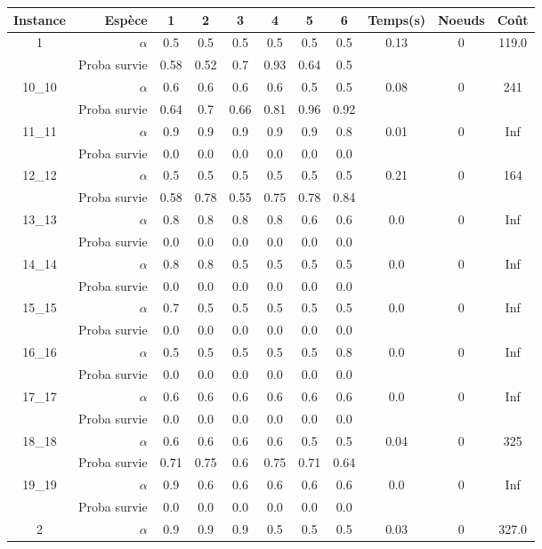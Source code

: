 \documentclass[main.tex]{subfiles}
\begin{document}
	\begin{center}
	\begin{tabular}{|c||r|c|c|c|c|c|c||c|c|c|}
    \hline
    \textbf{Instance}&\textbf{Espèce}&1&2&3&4&5&6&\textbf{Temps(s)}&\textbf{Noeuds}&\textbf{Coût}\\
\hline\hline
1 &$\alpha$&0.5 &0.5 &0.5 &0.5 &0.5 &0.5 &0.13 &0 &119.0\\
&Proba survie &0.58 &0.52 &0.7 &0.93 &0.64 &0.5 && &\\
\hline\hline
10_10 &$\alpha$&0.6 &0.6 &0.6 &0.6 &0.5 &0.5 &0.08 &0 &241\\
&Proba survie &0.64 &0.7 &0.66 &0.81 &0.96 &0.92 && &\\
\hline\hline
11_11 &$\alpha$&0.9 &0.9 &0.9 &0.9 &0.9 &0.8 &0.01 &0 &Inf\\
&Proba survie &0.0 &0.0 &0.0 &0.0 &0.0 &0.0 && &\\
\hline\hline
12_12 &$\alpha$&0.5 &0.5 &0.5 &0.5 &0.5 &0.5 &0.21 &0 &164\\
&Proba survie &0.58 &0.78 &0.55 &0.75 &0.78 &0.84 && &\\
\hline\hline
13_13 &$\alpha$&0.8 &0.8 &0.8 &0.8 &0.6 &0.6 &0.0 &0 &Inf\\
&Proba survie &0.0 &0.0 &0.0 &0.0 &0.0 &0.0 && &\\
\hline\hline
14_14 &$\alpha$&0.8 &0.8 &0.5 &0.5 &0.5 &0.5 &0.0 &0 &Inf\\
&Proba survie &0.0 &0.0 &0.0 &0.0 &0.0 &0.0 && &\\
\hline\hline
15_15 &$\alpha$&0.7 &0.5 &0.5 &0.5 &0.5 &0.5 &0.0 &0 &Inf\\
&Proba survie &0.0 &0.0 &0.0 &0.0 &0.0 &0.0 && &\\
\hline\hline
16_16 &$\alpha$&0.5 &0.5 &0.5 &0.5 &0.5 &0.8 &0.0 &0 &Inf\\
&Proba survie &0.0 &0.0 &0.0 &0.0 &0.0 &0.0 && &\\
\hline\hline
17_17 &$\alpha$&0.6 &0.6 &0.6 &0.6 &0.6 &0.6 &0.0 &0 &Inf\\
&Proba survie &0.0 &0.0 &0.0 &0.0 &0.0 &0.0 && &\\
\hline\hline
18_18 &$\alpha$&0.6 &0.6 &0.6 &0.6 &0.5 &0.5 &0.04 &0 &325\\
&Proba survie &0.71 &0.75 &0.6 &0.75 &0.71 &0.64 && &\\
\hline\hline
19_19 &$\alpha$&0.9 &0.6 &0.6 &0.6 &0.6 &0.6 &0.0 &0 &Inf\\
&Proba survie &0.0 &0.0 &0.0 &0.0 &0.0 &0.0 && &\\
\hline\hline
2 &$\alpha$&0.9 &0.9 &0.9 &0.5 &0.5 &0.5 &0.03 &0 &327.0\\

\end{tabular}
\end{center}
\end{document}
